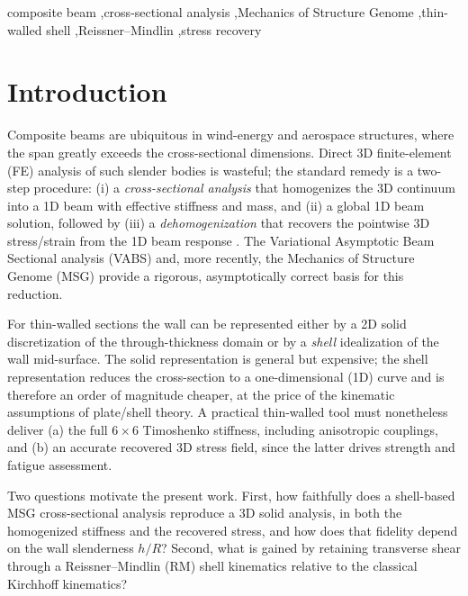 \documentclass[preprint,12pt]{elsarticle}
\newcommand{\hR}{h/R}
\begin{document}
\begin{frontmatter}
\begin{keyword}
composite beam \sep cross-sectional analysis \sep Mechanics of Structure Genome
\sep thin-walled shell \sep Reissner--Mindlin \sep stress recovery
\end{keyword}

\end{frontmatter}

\section{Introduction}
Composite beams are ubiquitous in wind-energy and aerospace structures, where
the span greatly exceeds the cross-sectional dimensions. Direct 3D
finite-element (FE) analysis of such slender bodies is wasteful; the standard
remedy is a two-step procedure: (i) a \emph{cross-sectional analysis} that
homogenizes the 3D continuum into a 1D beam with effective stiffness and mass,
and (ii) a global 1D beam solution, followed by (iii) a
\emph{dehomogenization} that recovers the pointwise 3D stress/strain from the
1D beam response \cite{hodges2006,yu2002}. The Variational Asymptotic Beam
Sectional analysis (VABS) \cite{cesnik1997,yu2002,yu2012vabs} and, more
recently, the Mechanics of Structure Genome (MSG) \cite{yu2016msg,liu2017msg}
provide a rigorous, asymptotically correct basis for this reduction.

For thin-walled sections the wall can be represented either by a 2D solid
discretization of the through-thickness domain or by a \emph{shell}
idealization of the wall mid-surface. The solid representation is general but
expensive; the shell representation reduces the cross-section to a
one-dimensional (1D) curve and is therefore an order of magnitude cheaper, at
the price of the kinematic assumptions of plate/shell theory. A practical
thin-walled tool must nonetheless deliver (a) the full $6\times6$ Timoshenko
stiffness, including anisotropic couplings, and (b) an accurate recovered 3D
stress field, since the latter drives strength and fatigue assessment.

Two questions motivate the present work. First, how faithfully does a
shell-based MSG cross-sectional analysis reproduce a 3D solid analysis, in both
the homogenized stiffness and the recovered stress, and how does that fidelity
depend on the wall slenderness $\hR$? Second, what is gained by retaining
transverse shear through a Reissner--Mindlin (RM) shell kinematics relative to
the classical Kirchhoff kinematics?
\end{document}
